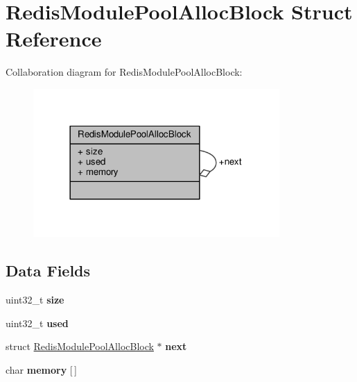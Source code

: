 \hypertarget{structRedisModulePoolAllocBlock}{}\section{Redis\+Module\+Pool\+Alloc\+Block Struct Reference}
\label{structRedisModulePoolAllocBlock}


Collaboration diagram for Redis\+Module\+Pool\+Alloc\+Block\+:\nopagebreak
\begin{figure}[H]
\begin{center}
\leavevmode
\includegraphics[width=266pt]{structRedisModulePoolAllocBlock__coll__graph}
\end{center}
\end{figure}
\subsection*{Data Fields}
\begin{DoxyCompactItemize}
\item 
\mbox{\label{structRedisModulePoolAllocBlock_a7b01580bd9bc7606e13bb5b46bd2f7d9}} 
uint32\+\_\+t {\bfseries size}
\item 
\mbox{\label{structRedisModulePoolAllocBlock_a1c1dc77f687a3100278752c41e07560d}} 
uint32\+\_\+t {\bfseries used}
\item 
\mbox{\label{structRedisModulePoolAllocBlock_aa65df519d8dafb32db9d001a432f62ee}} 
struct \hyperlink{structRedisModulePoolAllocBlock}{Redis\+Module\+Pool\+Alloc\+Block} $\ast$ {\bfseries next}
\item 
\mbox{\label{structRedisModulePoolAllocBlock_ab9b222e50bde27607971fd9a331afb38}} 
char {\bfseries memory} \mbox{[}$\,$\mbox{]}
\end{DoxyCompactItemize}


